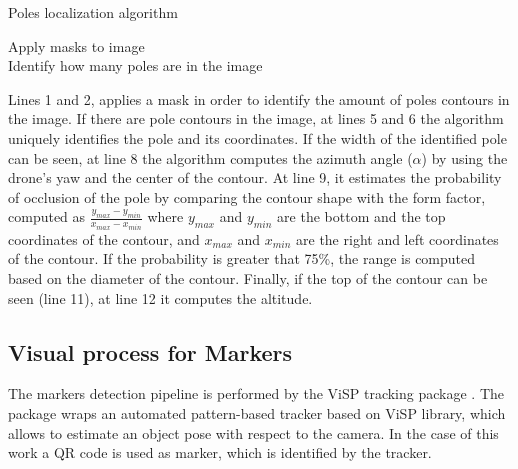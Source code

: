 \begin{algorithm}[h]
    \caption{Poles localization algorithm}
    \label{alg:chapter2:visual_pipeline:poles}
    \BlankLine
    \BlankLine
    Apply masks to image\\
    Identify how many poles are in the image\\
    \BlankLine
    \Return{$\alpha$, $\beta$, $\rho$}
\end{algorithm}

Lines 1 and 2, applies a mask in order to identify the amount of poles contours in the image. If there are pole contours in the image, at lines 5 and 6 the algorithm uniquely identifies the pole and its coordinates. If the width of the identified pole can be seen, at line 8 the algorithm computes the azimuth angle ($\alpha$) by using the drone's yaw and the center of the contour. At line 9, it estimates the probability of occlusion of the pole by comparing the contour shape with the form factor, computed as $\frac{y_{max} - y_{min}}{x_{max} - x_{min}}$ where $y_{max}$ and $y_{min}$ are the bottom and the top coordinates of the contour, and $x_{max}$ and $x_{min}$ are the right and left coordinates of the contour. If the probability is greater that 75\%, the range is computed based on the diameter of the contour. Finally, if the top of the contour can be seen (line 11), at line 12 it computes the altitude.

\subsection{Visual process for Markers}
The markers detection pipeline is performed by the \ac{ViSP} tracking package \cite{visp-paper}. The package wraps an automated pattern-based tracker based on ViSP library, which allows to estimate an object pose with respect to the camera. In the case of this work a QR code is used as marker, which is identified by the tracker. \\

